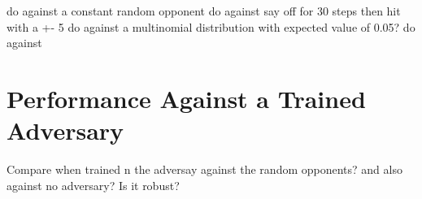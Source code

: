 \documentclass[../main.tex]{subfiles}
\begin{document}
do against a constant random opponent
do against say off for 30 steps then hit with a +- 5
do against a multinomial distribution with expected value of 0.05?
do against

\section{Performance Against a Trained Adversary}

Compare when trained n the adversay against the random opponents? and also against no adversary? Is it robust?
\end{document}
